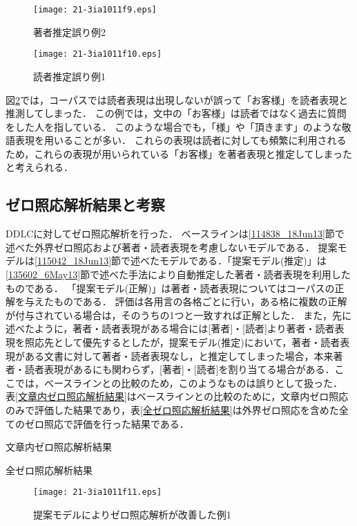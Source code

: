 \documentclass[japanese]{jnlp_1.4}
\begin{document}
\begin{figure}[t]
\texttt{[image: 21-3ia1011f9.eps]}
\caption{著者推定誤り例2}
\label{著者推定誤り例2}
\end{figure}
\begin{figure}[t]
\texttt{[image: 21-3ia1011f10.eps]}
\caption{読者推定誤り例1}
\label{読者推定誤り例1}
\end{figure}

図\ref{読者推定誤り例1}では，コーパスでは読者表現は出現しないが誤って「お客様」を読者表現と推測してしまった．
この例では，文中の「お客様」は読者ではなく過去に質問をした人を指している．
このような場合でも，「様」や「頂きます」のような敬語表現を用いることが多い．
これらの表現は読者に対しても頻繁に利用されるため，これらの表現が用いられている「お客様」を著者表現と推定してしまったと考えられる．



\subsection{ゼロ照応解析結果と考察}

DDLCに対してゼロ照応解析を行った．
ベースラインは\ref{114838_18Jun13}節で述べた外界ゼロ照応および著者・読者表現を考慮しないモデルである．
提案モデルは\ref{115042_18Jun13}節で述べたモデルである．「提案モデル(推定)」は\ref{135602_6May13}節で述べた手法により自動推定した著者・読者表現を利用したものである．
「提案モデル(正解)」は著者・読者表現についてはコーパスの正解を与えたものである．
評価は各用言の各格ごとに行い，ある格に複数の正解が付与されている場合は，そのうちの1つと一致すれば正解とした．
また，先に述べたように，著者・読者表現がある場合には[著者]・[読者]より著者・読者表現を照応先として優先するとしたが，提案モデル(推定)において，著者・読者表現がある文書に対して著者・読者表現なし，と推定してしまった場合，本来著者・読者表現があるにも関わらず，[著者]・[読者]を割り当てる場合がある．ここでは，ベースラインとの比較のため，このようなものは誤りとして扱った．
表\ref{文章内ゼロ照応解析結果}はベースラインとの比較のために，文章内ゼロ照応のみで評価した結果であり，表\ref{全ゼロ照応解析結果}は外界ゼロ照応を含めた全てのゼロ照応で評価を行った結果である．

\begin{table}[b]
\begin{minipage}{0.49\textwidth}
\caption{文章内ゼロ照応解析結果}
\label{文章内ゼロ照応解析結果}

\end{minipage}
\hfill
\begin{minipage}{0.49\textwidth}
\caption{全ゼロ照応解析結果}
\label{全ゼロ照応解析結果}

\end{minipage}
\end{table}
\begin{figure}[b]
\texttt{[image: 21-3ia1011f11.eps]}
\caption{提案モデルによりゼロ照応解析が改善した例1}
\label{提案モデルによりゼロ照応解析が改善した例}
\end{figure}
\end{document}
